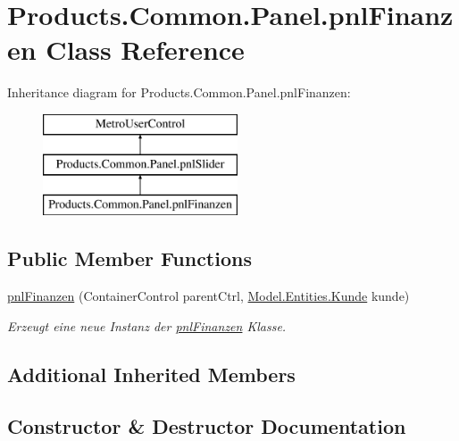 \hypertarget{class_products_1_1_common_1_1_panel_1_1pnl_finanzen}{}\section{Products.\+Common.\+Panel.\+pnl\+Finanzen Class Reference}
\label{class_products_1_1_common_1_1_panel_1_1pnl_finanzen}
Inheritance diagram for Products.\+Common.\+Panel.\+pnl\+Finanzen\+:\begin{figure}[H]
\begin{center}
\leavevmode
\includegraphics[height=3.000000cm]{class_products_1_1_common_1_1_panel_1_1pnl_finanzen}
\end{center}
\end{figure}
\subsection*{Public Member Functions}
\begin{DoxyCompactItemize}
\item 
\hyperlink{class_products_1_1_common_1_1_panel_1_1pnl_finanzen_a03d0880a7e7c2600e2cd0090cad18aa6}{pnl\+Finanzen} (Container\+Control parent\+Ctrl, \hyperlink{class_products_1_1_model_1_1_entities_1_1_kunde}{Model.\+Entities.\+Kunde} kunde)
\begin{DoxyCompactList}\small\item\em Erzeugt eine neue Instanz der \hyperlink{class_products_1_1_common_1_1_panel_1_1pnl_finanzen}{pnl\+Finanzen} Klasse. \end{DoxyCompactList}\end{DoxyCompactItemize}
\subsection*{Additional Inherited Members}


\subsection{Constructor \& Destructor Documentation}
